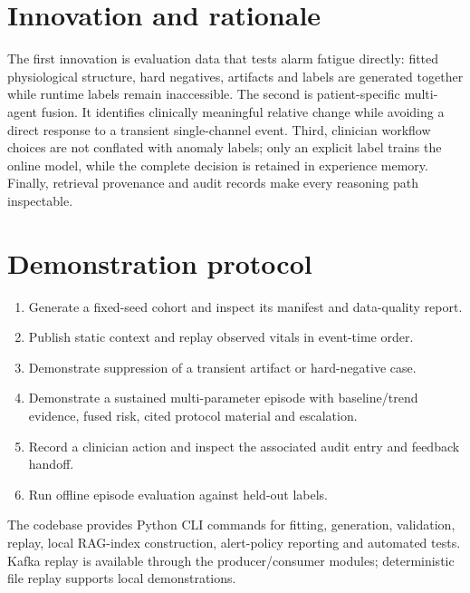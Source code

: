 \documentclass[11pt,a4paper]{article}
\begin{document}
\section{Innovation and rationale}
The first innovation is evaluation data that tests alarm fatigue directly: fitted physiological structure, hard negatives, artifacts and labels are generated together while runtime labels remain inaccessible. The second is patient-specific multi-agent fusion. It identifies clinically meaningful relative change while avoiding a direct response to a transient single-channel event. Third, clinician workflow choices are not conflated with anomaly labels; only an explicit label trains the online model, while the complete decision is retained in experience memory. Finally, retrieval provenance and audit records make every reasoning path inspectable.

\section{Demonstration protocol}
\begin{enumerate}[nosep]
\item Generate a fixed-seed cohort and inspect its manifest and data-quality report.
\item Publish static context and replay observed vitals in event-time order.
\item Demonstrate suppression of a transient artifact or hard-negative case.
\item Demonstrate a sustained multi-parameter episode with baseline/trend evidence, fused risk, cited protocol material and escalation.
\item Record a clinician action and inspect the associated audit entry and feedback handoff.
\item Run offline episode evaluation against held-out labels.
\end{enumerate}
The codebase provides Python CLI commands for fitting, generation, validation, replay, local RAG-index construction, alert-policy reporting and automated tests. Kafka replay is available through the producer/consumer modules; deterministic file replay supports local demonstrations.
\end{document}
